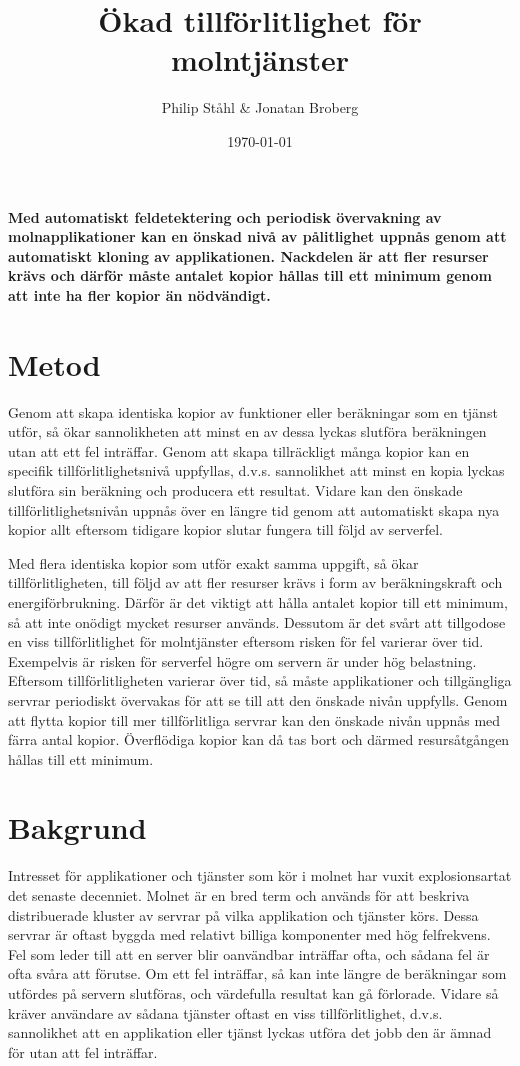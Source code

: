 \documentclass{article}
\author{
	Philip Ståhl \& Jonatan Broberg
}
\title{Ökad tillförlitlighet för molntjänster}
\date{\today}
\begin{document}
\maketitle

\begin{multicols}{2}
\noindent
\textbf{Med automatiskt feldetektering och periodisk övervakning av molnapplikationer kan en önskad nivå av pålitlighet uppnås genom att automatiskt kloning av applikationen. Nackdelen är att fler resurser krävs och därför måste antalet kopior hållas till ett minimum genom att inte ha fler kopior än nödvändigt.}

\section*{Metod}
Genom att skapa identiska kopior av funktioner eller beräkningar som en tjänst utför, så ökar sannolikheten att minst en av dessa lyckas slutföra beräkningen utan att ett fel inträffar. Genom att skapa tillräckligt många kopior kan en specifik tillförlitlighetsnivå uppfyllas, d.v.s. sannolikhet att minst en kopia lyckas slutföra sin beräkning och producera ett resultat. Vidare kan den önskade tillförlitlighetsnivån uppnås över en längre tid genom att automatiskt skapa nya kopior allt eftersom tidigare kopior slutar fungera till följd av serverfel.

Med flera identiska kopior som utför exakt samma uppgift, så ökar tillförlitligheten, till följd av att fler resurser krävs i form av beräkningskraft och energiförbrukning. Därför är det viktigt att hålla antalet kopior till ett minimum, så att inte onödigt mycket resurser används. Dessutom är det svårt att tillgodose en viss tillförlitlighet för molntjänster eftersom risken för fel varierar över tid. Exempelvis är risken för serverfel högre om servern är under hög belastning. Eftersom tillförlitligheten varierar över tid, så måste applikationer och tillgängliga servrar periodiskt övervakas för att se till att den önskade nivån uppfylls. Genom att flytta kopior till mer tillförlitliga servrar kan den önskade nivån uppnås med färra antal kopior. Överflödiga kopior kan då tas bort och därmed resursåtgången hållas till ett minimum.

\section*{Bakgrund}
Intresset för applikationer och tjänster som kör i molnet har vuxit explosionsartat det senaste decenniet. Molnet är en bred term och används för att beskriva distribuerade kluster av servrar på vilka applikation och tjänster körs. Dessa servrar är oftast byggda med relativt billiga komponenter med hög felfrekvens. Fel som leder till att en server blir oanvändbar inträffar ofta, och sådana fel är ofta svåra att förutse. Om ett fel inträffar, så kan inte längre de beräkningar som utfördes på servern slutföras, och värdefulla resultat kan gå förlorade. Vidare så kräver användare av sådana tjänster oftast en viss tillförlitlighet, d.v.s. sannolikhet att en applikation eller tjänst lyckas utföra det jobb den är ämnad för utan att fel inträffar. 


\end{multicols}
\end{document}
